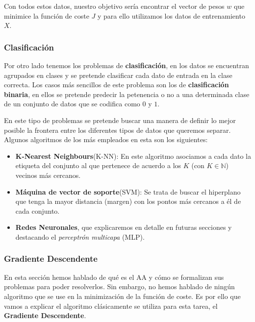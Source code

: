             \noindent Con todos estos datos, nuestro objetivo sería encontrar el vector de pesos $w$ que minimice la función de coste $J$ y para ello utilizamos los datos de entrenamiento $X$.     
            
            
        \subsubsection{Clasificación}
            \noindent Por otro lado tenemos los problemas de \textbf{clasificación}, en los datos se encuentran agrupados en clases y se pretende clasificar cada dato de entrada en la clase correcta. Los casos más sencillos de este problema son los de \textbf{clasificación binaria}, en ellos se pretende predecir la petenencia o no a una determinada clase de un conjunto de datos que se codifica como $0$ y $1$. 

            \medskip

            \noindent En este tipo de problemas se pretende buscar una manera de definir lo mejor posible la frontera entre los diferentes tipos de datos que queremos separar. Algunos algoritmos de los más empleados en esta son los siguientes: 

             \begin{itemize}
                \item \textbf{K-Nearest Neighbours}(K-NN): En este algoritmo asociamos a cada dato la etiqueta del conjunto al que pertenece de acuerdo a los $K$ (con $K \in \mathbb{N}$) vecinos más cercanos.
                \item \textbf{Máquina de vector de soporte}(SVM): Se trata de buscar el hiperplano que tenga la mayor distancia (margen) con los pontos más cercanos a él de cada conjunto.
                \item \textbf{Redes Neuronales}, que explicaremos en detalle en futuras secciones y destacando el \textit{perceptrón multicapa} (MLP).
             \end{itemize}


        \subsubsection{Gradiente Descendente}
            \noindent En esta sección hemos hablado de qué es el AA y cómo se formalizan sus problemas para poder resolverlos. Sin embargo, no hemos hablado de ningún algoritmo que se use en la minimización de la función de coste. Es por ello que vamos a explicar el algoritmo clásicamente se utiliza para esta tarea, el \textbf{Gradiente Descendente}. 
    
